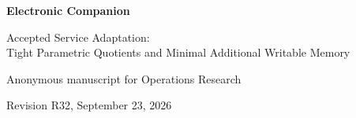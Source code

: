 \documentclass[11pt,letterpaper]{article}
\theoremstyle{definition}\newtheorem{assumption}[theorem]{Assumption}
\begin{document}
\begin{center}{\Large\bfseries Electronic Companion}\par\medskip
{\large Accepted Service Adaptation:\\ Tight Parametric Quotients and Minimal Additional Writable Memory}\par\medskip
Anonymous manuscript for Operations Research\par
Revision R32, September 23, 2026
\end{center}





\end{document}
